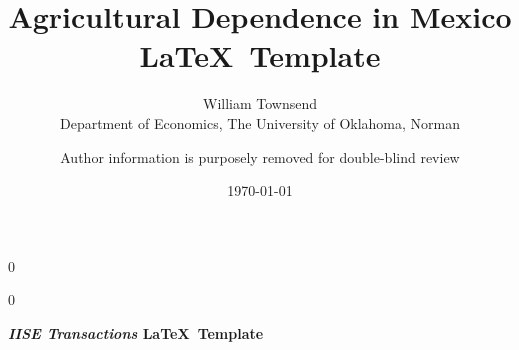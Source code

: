 \documentclass[12pt]{article}
\newcommand{\blind}{0}
\begin{document}
		
		\def\spacingset#1{\renewcommand{\baselinestretch}%
			{#1}\small\normalsize} \spacingset{1}
		
		\blind
		{
			\title{\bf Agricultural Dependence in Mexico}
			
			\author{ William Townsend  \\
			Department of Economics, The University of Oklahoma, Norman\\
             }
			\date{\today}
			\maketitle
		} \fi
		
		\blind
		{

            \title{\bf \emph{} \LaTeX \ Template}
			\author{Author information is purposely removed for double-blind review}
			
\bigskip
			\bigskip
			\bigskip
			\begin{center}
				{\LARGE\bf \emph{IISE Transactions} \LaTeX \ Template}
			\end{center}
			\medskip
		} \fi
		\bigskip
		
%		
%			
%
\end{document}
